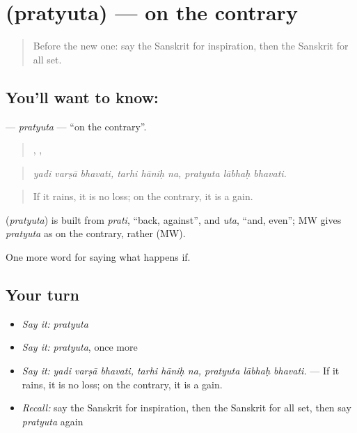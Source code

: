 \section[\texorpdfstring{\sk{प्रत्युत} (pratyuta)}{प्रत्युत (pratyuta)}]{ (pratyuta) — on the contrary}

\label{lesson:SA-C555-pratyuta}



\begin{quote}
Before the new one: say the Sanskrit for inspiration, then the Sanskrit for all set.
\end{quote}

\subsection*{You'll want to know: }
\textbf{} — \emph{pratyuta} — \textquotedblleft{}on the contrary\textquotedblright{}.

\begin{quote}
  ,   ,   
\end{quote}

\begin{quote}
\emph{yadi varṣā bhavati, tarhi hāniḥ na, pratyuta lābhaḥ bhavati.}
\end{quote}

\begin{quote}
If it rains, it is no loss; on the contrary, it is a gain.
\end{quote}

\begin{cousinweb}
\textbf{} (\emph{pratyuta}) is built from \emph{prati}, \textquotedblleft{}back, against\textquotedblright{}, and \emph{uta}, \textquotedblleft{}and, even\textquotedblright{}; MW gives \emph{pratyuta} as on the contrary, rather (MW).
\end{cousinweb}

\begin{grammarlens}[title={What you've built}]
One more word for saying what happens if.
\end{grammarlens}

\subsection*{Your turn}
\begin{itemize}
\raggedright
  \item \emph{Say it:} \emph{pratyuta}
  \item \emph{Say it:} \emph{pratyuta}, once more
  \item \emph{Say it:} \emph{yadi varṣā bhavati, tarhi hāniḥ na, pratyuta lābhaḥ bhavati.} — If it rains, it is no loss; on the contrary, it is a gain.
  \item \emph{Recall:} say the Sanskrit for inspiration, then the Sanskrit for all set, then say \emph{pratyuta} again
\end{itemize}

